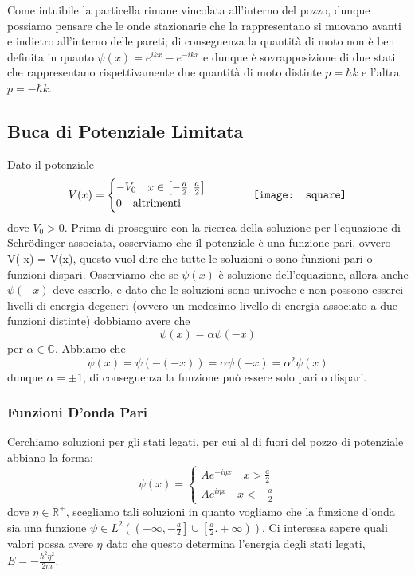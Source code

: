 \noindent Come intuibile la particella rimane vincolata all'interno del pozzo, dunque possiamo pensare che le onde stazionarie che la rappresentano si muovano avanti e indietro all'interno delle pareti; di conseguenza la quantit\`a di moto non \`e ben definita in quanto $\psi(x) = e^{ikx} - e^{-ikx}$ e dunque \`e sovrapposizione di due stati che rappresentano rispettivamente due quantit\`a di moto distinte $p = \hbar k$ e l'altra $p = - \hbar k$.

\subsection{Buca di Potenziale Limitata}

Dato il potenziale 
\begin{equation*}
	V(x) = \begin{cases}
		-V_0 \quad x \in \left [-\frac{a}{2}, \frac{a}{2} \right ] \\
		0 \quad \text{altrimenti}
	\end{cases}
	\quad\quad\quad 
 	\vcenter{\hbox{\texttt{[image: square]}}}
\end{equation*}
dove $V_0 > 0$. Prima di proseguire con la ricerca della soluzione per l'equazione di Schr\"odinger associata, osserviamo che il potenziale \`e una funzione pari, ovvero V(-x) = V(x), questo vuol dire che tutte le soluzioni o sono funzioni pari o funzioni dispari. Osserviamo che se $\psi(x)$ \`e soluzione dell'equazione, allora anche $\psi(-x)$ deve esserlo, e dato che le soluzioni sono univoche e non possono esserci livelli di energia degeneri (ovvero un medesimo livello di energia associato a due funzioni distinte) dobbiamo avere che 
\begin{equation*}
	\psi(x) = \alpha \psi(-x)
\end{equation*}
per $\alpha \in \mathbb{C}$. Abbiamo che 
\begin{equation*}
	\psi(x) = \psi(-(-x)) = \alpha\psi(-x) = \alpha^2\psi(x)
\end{equation*}
dunque $\alpha = \pm 1$, di conseguenza la funzione pu\`o essere solo pari o dispari.

\subsubsection{Funzioni D'onda Pari}

Cerchiamo soluzioni per gli stati legati, per cui al di fuori del pozzo di potenziale abbiano la forma:
\begin{equation*}
\psi(x) = 
\begin{cases}
	Ae^{-i\eta x} \quad x > \frac{a}{2}\\
	Ae^{i\eta x} \quad x < -\frac{a}{2}
\end{cases}
\end{equation*}
dove $\eta \in \mathbb{R}^+$, scegliamo tali soluzioni in quanto vogliamo che la funzione d'onda sia una funzione $\psi \in L^2 \left (\left (-\infty,-\frac{a}{2} \right ] \cup \left [\frac{a}{2}.+ \infty \right )\right )$. Ci interessa sapere quali valori possa avere $\eta$ dato che questo determina l'energia degli stati legati, $E = -\frac{\hbar^2 \eta^2}{2m}$.
\newline 

